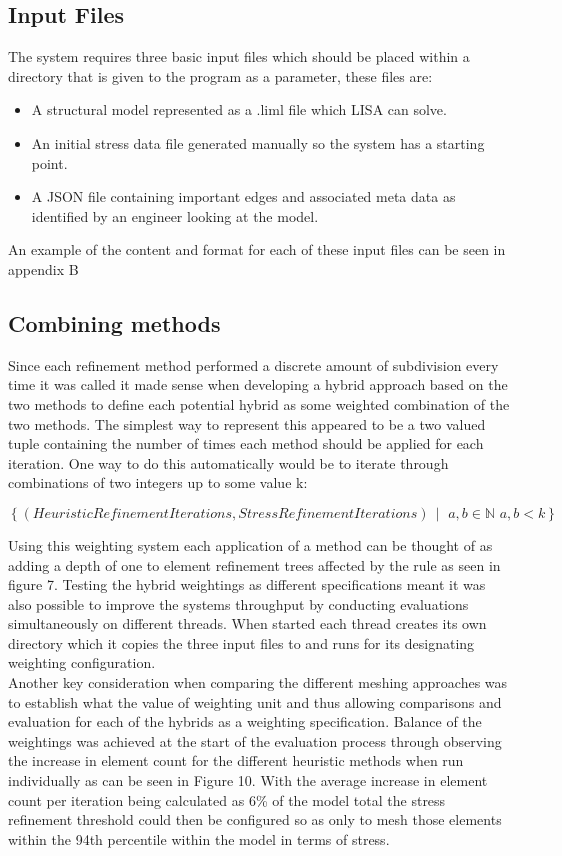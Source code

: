 \subsection{Input Files}
The system requires three basic input files which should be placed within a directory that is given to the program as a parameter, these files are:

\begin{itemize}
\item A structural model represented as a .liml file which LISA can solve.
\item An initial stress data file generated manually so the system has a starting point.
\item A JSON file containing important edges and associated meta data as identified by an engineer looking at the model.
\end{itemize}

An example of the content and format for each of these input files can be seen in appendix B


\subsection{Combining methods}
Since each refinement method performed a discrete amount of subdivision every time it was called it made sense when developing a hybrid approach based on the two methods to define each potential hybrid as some weighted combination of the two methods. The simplest way to represent this appeared to be a two valued tuple containing the number of times each method should be applied for each iteration. One way to do this automatically would be to iterate through combinations of two integers up to some value k:

\[ \left\{ (HeuristicRefinementIterations, StressRefinementIterations) \,\middle|\, \, a,b \in \mathbb{N}\, \, a,b < k \right\} \]

\noindent
Using this weighting system each application of a method can be thought of as adding a depth of one to element refinement trees affected by the rule as seen in figure 7. Testing the hybrid weightings as different specifications meant it was also possible to improve the systems throughput by conducting evaluations simultaneously on different threads. When started each thread creates its own directory which it copies the three input files to and runs for its designating weighting configuration. \\

\noindent
Another key consideration when comparing the different meshing approaches was to establish what the value of weighting unit and thus allowing comparisons and evaluation for each of the hybrids as a weighting specification. Balance of the weightings was achieved at the start of the evaluation process through observing the increase in element count for the different heuristic methods when run individually as can be seen in Figure 10. With the average increase in element count per iteration being calculated as 6\% of the model total the stress refinement threshold could then be configured so as only to mesh those elements within the 94th percentile within the model in terms of stress. \\

